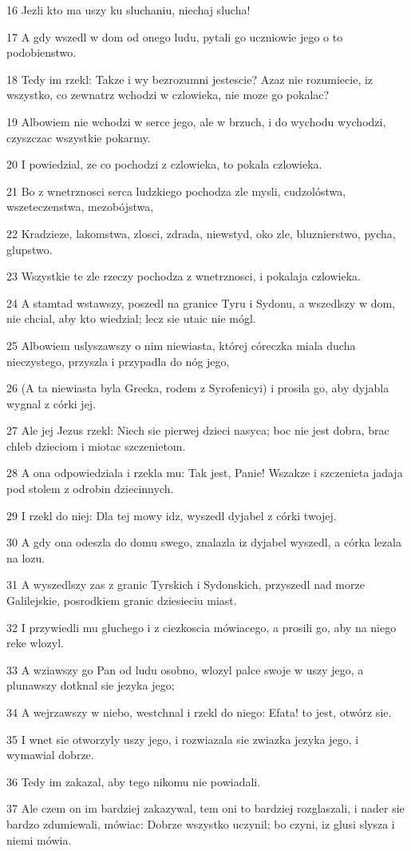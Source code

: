 \par 16 Jezli kto ma uszy ku sluchaniu, niechaj slucha!
\par 17 A gdy wszedl w dom od onego ludu, pytali go uczniowie jego o to podobienstwo.
\par 18 Tedy im rzekl: Takze i wy bezrozumni jestescie? Azaz nie rozumiecie, iz wszystko, co zewnatrz wchodzi w czlowieka, nie moze go pokalac?
\par 19 Albowiem nie wchodzi w serce jego, ale w brzuch, i do wychodu wychodzi, czyszczac wszystkie pokarmy.
\par 20 I powiedzial, ze co pochodzi z czlowieka, to pokala czlowieka.
\par 21 Bo z wnetrznosci serca ludzkiego pochodza zle mysli, cudzolóstwa, wszeteczenstwa, mezobójstwa,
\par 22 Kradzieze, lakomstwa, zlosci, zdrada, niewstyd, oko zle, bluznierstwo, pycha, glupstwo.
\par 23 Wszystkie te zle rzeczy pochodza z wnetrznosci, i pokalaja czlowieka.
\par 24 A stamtad wstawszy, poszedl na granice Tyru i Sydonu, a wszedlszy w dom, nie chcial, aby kto wiedzial; lecz sie utaic nie mógl.
\par 25 Albowiem uslyszawszy o nim niewiasta, której córeczka miala ducha nieczystego, przyszla i przypadla do nóg jego,
\par 26 (A ta niewiasta byla Grecka, rodem z Syrofenicyi) i prosila go, aby dyjabla wygnal z córki jej.
\par 27 Ale jej Jezus rzekl: Niech sie pierwej dzieci nasyca; boc nie jest dobra, brac chleb dzieciom i miotac szczenietom.
\par 28 A ona odpowiedziala i rzekla mu: Tak jest, Panie! Wszakze i szczenieta jadaja pod stolem z odrobin dziecinnych.
\par 29 I rzekl do niej: Dla tej mowy idz, wyszedl dyjabel z córki twojej.
\par 30 A gdy ona odeszla do domu swego, znalazla iz dyjabel wyszedl, a córka lezala na lozu.
\par 31 A wyszedlszy zas z granic Tyrskich i Sydonskich, przyszedl nad morze Galilejskie, posrodkiem granic dziesieciu miast.
\par 32 I przywiedli mu gluchego i z ciezkoscia mówiacego, a prosili go, aby na niego reke wlozyl.
\par 33 A wziawszy go Pan od ludu osobno, wlozyl palce swoje w uszy jego, a plunawszy dotknal sie jezyka jego;
\par 34 A wejrzawszy w niebo, westchnal i rzekl do niego: Efata! to jest, otwórz sie.
\par 35 I wnet sie otworzyly uszy jego, i rozwiazala sie zwiazka jezyka jego, i wymawial dobrze.
\par 36 Tedy im zakazal, aby tego nikomu nie powiadali.
\par 37 Ale czem on im bardziej zakazywal, tem oni to bardziej rozglaszali, i nader sie bardzo zdumiewali, mówiac: Dobrze wszystko uczynil; bo czyni, iz glusi slysza i niemi mówia.

